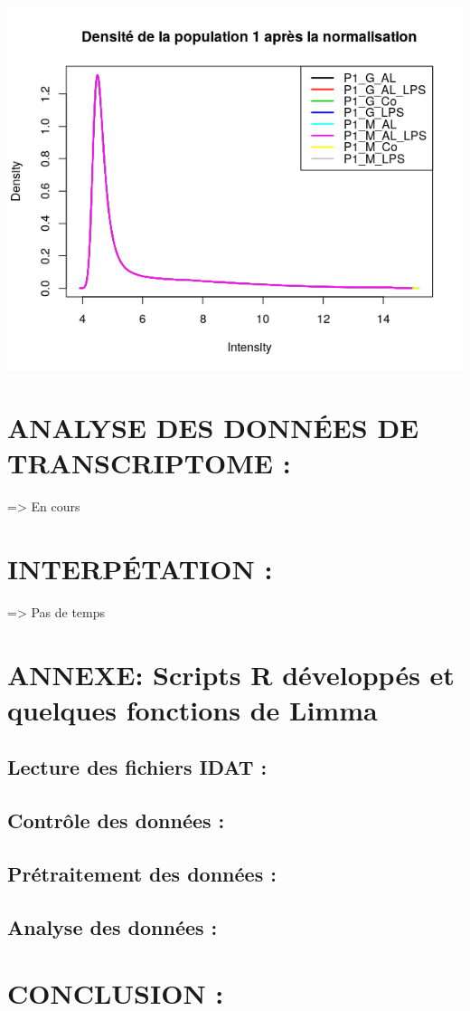 \documentclass[a4paper,10pt]{article}
\begin{document}
\begin{center}
 \includegraphics[scale=0.5]{../../R/output/Densitypop1C.png}
\end{center}

\section{ANALYSE DES DONN\'{E}ES DE TRANSCRIPTOME :}
=> En cours
\section{INTERP\'{E}TATION :}
=> Pas de temps
\section{ANNEXE: Scripts R développés et quelques fonctions de Limma}
\subsection{Lecture des fichiers IDAT :}
\subsection{Contrôle des données :}
\subsection{Prétraitement des données :}
\subsection{Analyse des données :}
\section{CONCLUSION :}
\nocite{smyth2005limma}
\nocite{druaghici2016statistics}
 

\end{document}

